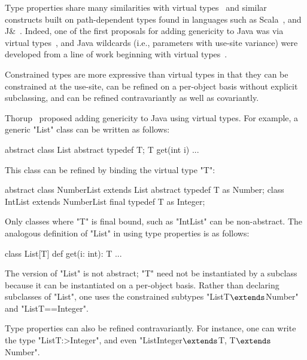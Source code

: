 
Type properties share many similarities with virtual
types~\cite{mp89-virtual-classes,beta,ernst99-gbeta,ernst06-virtual,cdnw07-tribe}
and similar constructs built on path-dependent types found in
languages such as Scala~\cite{scala}, and J\&~\cite{nqm06}.
Indeed, one of the first proposals for adding genericity to Java
was via virtual types~\cite{thorup97}, and Java
wildcards (i.e., parameters with use-site variance)
were developed from a line of work beginning with virtual
types~\cite{unifying-genericity,variant-parametric-types,adding-wildcards}.

Constrained types are more expressive than virtual
types in that they can be constrained at the use-site,
can be refined on a per-object basis without explicit subclassing,
and can be refined contravariantly
as well as covariantly.

Thorup~\cite{thorup97}
proposed adding genericity to Java using virtual types.  For example,
a generic \xcd"List" class can be written as follows:
{
\begin{xten}
abstract class List {
  abstract typedef T;
  T get(int i) { ... }
}
\end{xten}}
\noindent
This class can be refined by binding the virtual type \xcd"T":
{
\begin{xten}
abstract class NumberList extends List {
  abstract typedef T as Number;
}
class IntList extends NumberList {
  final typedef T as Integer;
}
\end{xten}}
\noindent
Only classes where \xcd"T" is final bound, such as \xcd"IntList"
can be non-abstract.
%
The analogous definition of 
\xcd"List" in \Xten{} using type properties is as follows:
{
\begin{xten}
class List[T] {
  def get(i: int): T { ... }
}
\end{xten}}

The \Xten{} version of \xcd"List" is not abstract;
\xcd"T" need not be instantiated by a subclass because it can be
instantiated on a per-object basis.
Rather than declaring subclasses of \xcd"List",
one uses the constrained subtypes
\xcdmath"List{T$\extends$Number}" and \xcd"List{T==Integer}".

Type properties can also be refined contravariantly.
For instance, one can write the type \xcd"List{T:>Integer}",
and even \xcdmath"List{Integer$\extends$T, T$\extends$Number}".

